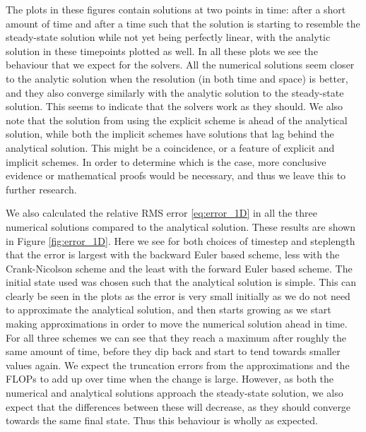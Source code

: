 \documentclass[reprint,english,notitlepage]{revtex4-1}  %
\begin{document}
The plots in these figures contain solutions at two points in time: after a short amount of time and after a time such that the solution is starting to resemble the steady-state solution while not yet being perfectly linear, with the analytic solution in these timepoints plotted as well. In all these plots we see the behaviour that we expect for the solvers. All the numerical solutions seem closer to the analytic solution when the resolution (in both time and space) is better, and they also converge similarly with the analytic solution to the steady-state solution. This seems to indicate that the solvers work as they should. We also note that the solution from using the explicit scheme is ahead of the analytical solution, while both the implicit schemes have solutions that lag behind the analytical solution. This might be a coincidence, or a feature of explicit and implicit schemes. In order to determine which is the case, more conclusive evidence or mathematical proofs would be necessary, and thus we leave this to further research.

We also calculated the relative RMS error \eqref{eq:error_1D} in all the three numerical solutions compared to the analytical solution. These results are shown in Figure \ref{fig:error_1D}. Here we see for both choices of timestep and steplength that the error is largest with the backward Euler based scheme, less with the Crank-Nicolson scheme and the least with the forward Euler based scheme. The initial state used was chosen such that the analytical solution is simple. This can clearly be seen in the plots as the error is very small initially as we do not need to approximate the analytical solution, and then starts growing as we start making approximations in order to move the numerical solution ahead in time. For all three schemes we can see that they reach a maximum after roughly the same amount of time, before they dip back and start to tend towards smaller values again. We expect the truncation errors from the approximations and the FLOPs to add up over time when the change is large. However, as both the numerical and analytical solutions approach the steady-state solution, we also expect that the differences between these will decrease, as they should converge towards the same final state. Thus this behaviour is wholly as expected. 
\end{document}
